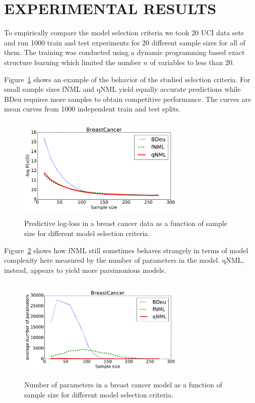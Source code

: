 \section{EXPERIMENTAL RESULTS}

To empirically compare the model selection criteria we took 20 UCI
data sets~\cite{Lichman:2013} and run 1000 train and test experiments
for 20 different sample sizes for all of them. The training was
conducted using a dynamic programming based exact structure
learning\cite{cosco.uai06} which limited the number $n$ of variables
to less than 20.

Figure~\ref{fig:bcmean} shows an example of the behavior of the
studied selection criteria.  For small sample sizes fNML and qNML
yield equally accurate predictions while BDeu requires more samples to
obtain competitive performance. The curves are mean curves from 1000
independent train and test splits.

\begin{figure}
\centering
\includegraphics[width=8cm,height=5cm]{breast_cancer_mean.pdf}
\caption{Predictive log-loss in a breast cancer data as a function of
  sample size for different model selection criteria.}
\label{fig:bcmean}
\end{figure}

Figure~\ref{fig:bcnpmean} shows how fNML still sometimes behaves
strangely in terms of model complexity here measured by the number of
parameters in the model.  qNML, instead, appears to yield more
parsimonious models.

\begin{figure}
\centering
\includegraphics[width=8cm,height=5cm]{breast_cancer_np_mean.pdf}
\caption{Number of parameters in a breast cancer model as a function
  of sample size for different model selection criteria.}
\label{fig:bcnpmean}
\end{figure}

